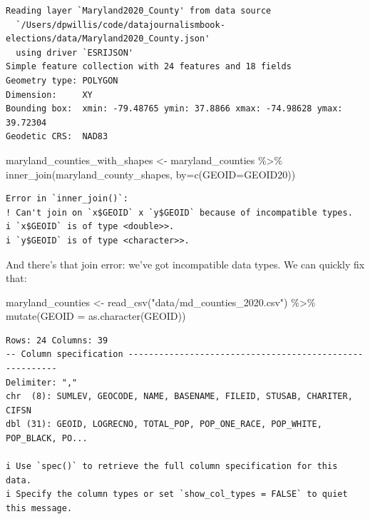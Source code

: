 \documentclass[
  letterpaper,
  DIV=11,
  numbers=noendperiod]{scrreprt}
\newenvironment{Shaded}{\begin{snugshade}}{\end{snugshade}}
\newcommand{\AttributeTok}[1]{\textcolor[rgb]{0.40,0.45,0.13}{#1}}
\newcommand{\FunctionTok}[1]{\textcolor[rgb]{0.28,0.35,0.67}{#1}}
\newcommand{\NormalTok}[1]{\textcolor[rgb]{0.00,0.23,0.31}{#1}}
\newcommand{\OtherTok}[1]{\textcolor[rgb]{0.00,0.23,0.31}{#1}}
\newcommand{\SpecialCharTok}[1]{\textcolor[rgb]{0.37,0.37,0.37}{#1}}
\newcommand{\StringTok}[1]{\textcolor[rgb]{0.13,0.47,0.30}{#1}}
\begin{document}
\begin{verbatim}
Reading layer `Maryland2020_County' from data source 
  `/Users/dpwillis/code/datajournalismbook-elections/data/Maryland2020_County.json' 
  using driver `ESRIJSON'
Simple feature collection with 24 features and 18 fields
Geometry type: POLYGON
Dimension:     XY
Bounding box:  xmin: -79.48765 ymin: 37.8866 xmax: -74.98628 ymax: 39.72304
Geodetic CRS:  NAD83
\end{verbatim}

\begin{Shaded}
\begin{Highlighting}[]
\NormalTok{maryland\_counties\_with\_shapes }\OtherTok{\textless{}{-}}\NormalTok{ maryland\_counties }\SpecialCharTok{\%\textgreater{}\%} \FunctionTok{inner\_join}\NormalTok{(maryland\_county\_shapes, }\AttributeTok{by=}\FunctionTok{c}\NormalTok{(}\StringTok{\textquotesingle{}GEOID\textquotesingle{}}\OtherTok{=}\StringTok{\textquotesingle{}GEOID20\textquotesingle{}}\NormalTok{))}
\end{Highlighting}
\end{Shaded}

\begin{verbatim}
Error in `inner_join()`:
! Can't join on `x$GEOID` x `y$GEOID` because of incompatible types.
i `x$GEOID` is of type <double>>.
i `y$GEOID` is of type <character>>.
\end{verbatim}

And there's that join error: we've got incompatible data types. We can
quickly fix that:

\begin{Shaded}
\begin{Highlighting}[]
\NormalTok{maryland\_counties }\OtherTok{\textless{}{-}} \FunctionTok{read\_csv}\NormalTok{(}\StringTok{"data/md\_counties\_2020.csv"}\NormalTok{) }\SpecialCharTok{\%\textgreater{}\%} \FunctionTok{mutate}\NormalTok{(}\AttributeTok{GEOID =} \FunctionTok{as.character}\NormalTok{(GEOID))}
\end{Highlighting}
\end{Shaded}

\begin{verbatim}
Rows: 24 Columns: 39
-- Column specification --------------------------------------------------------
Delimiter: ","
chr  (8): SUMLEV, GEOCODE, NAME, BASENAME, FILEID, STUSAB, CHARITER, CIFSN
dbl (31): GEOID, LOGRECNO, TOTAL_POP, POP_ONE_RACE, POP_WHITE, POP_BLACK, PO...

i Use `spec()` to retrieve the full column specification for this data.
i Specify the column types or set `show_col_types = FALSE` to quiet this message.
\end{verbatim}
\end{document}
